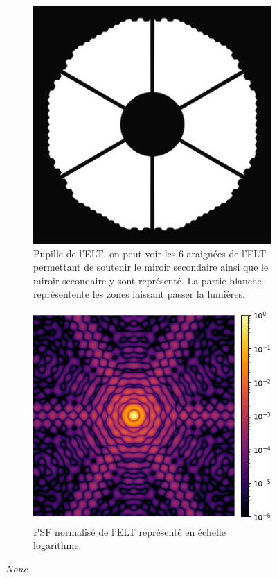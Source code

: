 \begin{figure}[htbp]
\centering
\begin{subfigure}[b]{0.40\textwidth}
\centering
\includegraphics[width=\textwidth]{figures/ELT_pupil.png}
\caption{Pupille de l'ELT. on peut voir les 6 araignées de l'ELT permettant de soutenir le miroir secondaire ainsi que le miroir secondaire y sont représenté. La partie blanche représentente les zones laissant passer la lumières.}
\label{fig:elt_pupil}
\end{subfigure}
\hfill
\begin{subfigure}[b]{0.46\textwidth}
\centering
\includegraphics[width=\textwidth]{figures/PSF_ELT.png}
\caption{PSF normalisé de l'ELT représenté en échelle logarithme.}
\label{fig:pupil_diff}
\end{subfigure}
\caption{\textit{None}}
\end{figure}

